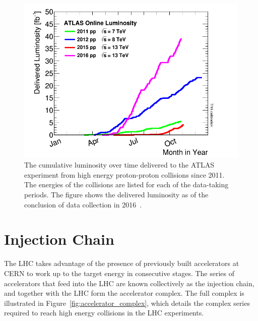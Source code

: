 \begin{figure}
\centering
\includegraphics[width=\fullfig]{figures/lumi_years.png}
\caption{The cumulative luminosity over time delivered to the ATLAS experiment from high energy proton-proton collisions since 2011. The energies of the collisions are listed for each of the data-taking periods. The figure shows the delivered luminosity  as of the conclusion of data collection in 2016~\cite{online_lumi}.}
\label{fig:lumi_years}
\end{figure}

\section{Injection Chain}
The \ac{LHC} takes advantage of the presence of previously built accelerators at \ac{CERN} to work up to the target energy in consecutive stages.
The series of accelerators that feed into the \ac{LHC} are known collectively as the injection chain, and together with the \ac{LHC} form the accelerator complex.
The full complex is illustrated in Figure~\ref{fig:accelerator_complex}, which details the complex series required to reach high energy collisions in the \ac{LHC} experiments.

